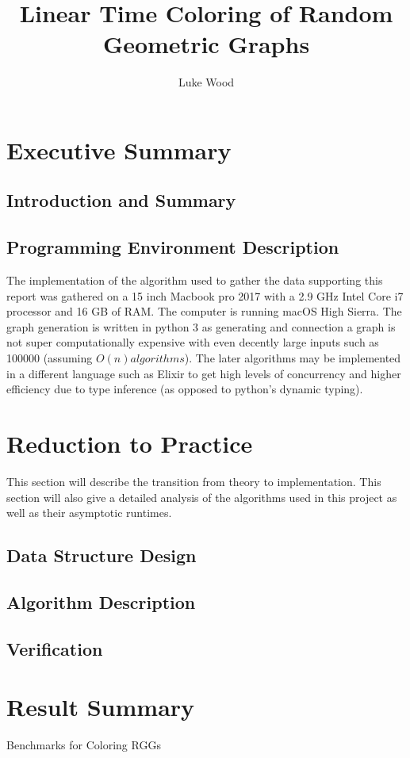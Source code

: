 \documentclass{article}
\begin{document}
  \title{Linear Time Coloring of Random Geometric Graphs}
  \author{Luke Wood}
  \maketitle

  \section{Executive Summary}
    \subsection{Introduction and Summary}
    \subsection{Programming Environment Description}
  		The implementation of the algorithm used to gather the data supporting this report was gathered on a 15 inch Macbook pro 2017 with a 2.9 GHz Intel Core i7 processor and 16 GB of RAM.
  		The computer is running macOS High Sierra.
  		The graph generation is written in python 3 as generating and connection a graph is not super computationally expensive with even decently large inputs such as 100000 (assuming $O(n) algorithms$).
  		The later algorithms may be implemented in a different language such as Elixir to get high levels of concurrency and higher efficiency due to type inference (as opposed to python's dynamic typing).
  \section{Reduction to Practice}
      This section will describe the transition from theory to implementation.
      This section will also give a detailed analysis of the algorithms used in this project as well as their asymptotic runtimes.
  	\subsection{Data Structure Design}
  	\subsection{Algorithm Description}
  	\subsection{Verification}
  \section{Result Summary}

  \begin{table}
    \centering
    \label{benchmarks}
    \caption{Benchmarks for Coloring RGGs}
  \end{table}

  \printbibliography
\end{document}
